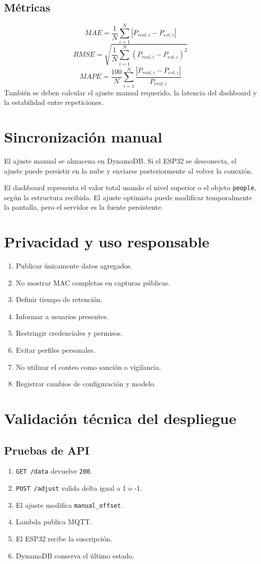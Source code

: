 \documentclass[12pt,a4paper]{article}
\begin{document}
\subsection{Métricas}
\[
MAE=\frac{1}{N}\sum_{i=1}^{N}|P_{real,i}-P_{est,i}|
\]
\[
RMSE=\sqrt{\frac{1}{N}\sum_{i=1}^{N}(P_{real,i}-P_{est,i})^2}
\]
\[
MAPE=\frac{100}{N}\sum_{i=1}^{N}\frac{|P_{real,i}-P_{est,i}|}{P_{real,i}}
\]
También se deben calcular el ajuste manual requerido, la latencia del dashboard y la estabilidad entre repeticiones.

\section{Sincronización manual}
El ajuste manual se almacena en DynamoDB. Si el ESP32 se desconecta, el ajuste puede persistir en la nube y enviarse posteriormente al volver la conexión.

El dashboard representa el valor total usando el nivel superior o el objeto \texttt{people}, según la estructura recibida. El ajuste optimista puede modificar temporalmente la pantalla, pero el servidor es la fuente persistente.

\section{Privacidad y uso responsable}
\begin{enumerate}
\item Publicar únicamente datos agregados.
\item No mostrar MAC completas en capturas públicas.
\item Definir tiempo de retención.
\item Informar a usuarios presentes.
\item Restringir credenciales y permisos.
\item Evitar perfiles personales.
\item No utilizar el conteo como sanción o vigilancia.
\item Registrar cambios de configuración y modelo.
\end{enumerate}

\section{Validación técnica del despliegue}
\subsection{Pruebas de API}
\begin{enumerate}
\item \texttt{GET /data} devuelve \texttt{200}.
\item \texttt{POST /adjust} valida delta igual a 1 o -1.
\item El ajuste modifica \texttt{manual\_offset}.
\item Lambda publica MQTT.
\item El ESP32 recibe la suscripción.
\item DynamoDB conserva el último estado.
\end{enumerate}
\end{document}
